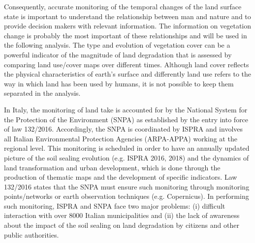 \documentclass[APA,LATO1COL,doublespace]{WileyNJD-v2}
\newcommand{\toberevised}[1]{\emph{\textcolor{red}{#1}}} %
\newcommand{\update}[1]{\emph{\textcolor{blue}{#1}}}     %
\begin{document}
Consequently, accurate monitoring of the temporal changes of the land surface state is important to understand the relationship between man and nature and to provide decision makers with relevant information.
The information on vegetation change is probably the most important of these relationships and will be used in the following analysis.
The type and evolution of vegetation cover can be a powerful indicator of the magnitude of land degradation that is assessed by comparing land use/cover maps over different times.
Although land cover reflects the physical characteristics of earth's surface and differently land use refers to the way in which land has been used by humans, it is not possible to keep them separated in the analysis.

In Italy, the monitoring of land take is accounted for by the National System for the Protection of the Environment (SNPA) as established by the entry into force of law 132/2016.
Accordingly, the SNPA is coordinated by ISPRA and involves all Italian Environmental Protection Agencies (ARPA-APPA) working at the regional level. 
This monitoring is scheduled in order to have an annually updated picture of the soil sealing evolution (e.g. ISPRA 2016, 2018) and the dynamics of land transformation and urban development, which is done through the production of thematic maps and the development of specific indicators. 
Law 132/2016 states that the SNPA must ensure such monitoring through monitoring points/networks or earth observation techniques (e.g. Copernicus).
In performing such monitoring, ISPRA and SNPA face two major problems: (i) difficult interaction with over 8000 Italian municipalities and (ii) the lack of awareness about the impact of the soil sealing on land degradation by citizens and other public authorities.

\end{document}
